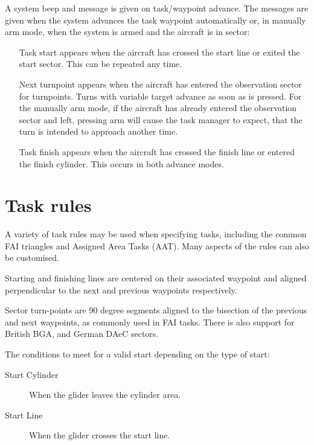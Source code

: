 A system beep and message is given on task/waypoint advance.  The
messages are given when the system advances the task waypoint
automatically or, in manually arm mode, when the system is armed and the
aircraft is in sector:
\begin{itemize}
\item[Task start]  appears when the aircraft has crossed the start line or
 exited the start sector. This can be repeated any time.
\item[Next turnpoint]  appears when the aircraft has entered the observation
 sector for turnpoints. Turns with variable target advance as soon as
  is pressed.  For the manually arm mode, if the
 aircraft has already entered the observation sector and left, pressing arm will
 cause the task manager to expect, that the turn is intended to approach
 another time.
\item[Task finish]  appears when the aircraft has crossed the finish line
 or entered the finish cylinder.  This occurs in both advance modes. 
\end{itemize}

\section{Task rules}\label{sec:task-rules}

A variety of task rules may be used when specifying tasks, including
the common FAI triangles and Assigned Area Tasks (AAT).  Many aspects
of the rules can also be customised.

Starting and finishing lines are centered on their associated waypoint
and aligned perpendicular to the next and previous waypoints
respectively.

Sector turn-points are 90 degree segments aligned to the bisection of
the previous and next waypoints, as commonly used in FAI tasks.
There is also support for British BGA, and German DAeC sectors.

The conditions to meet for a valid start depending on the type of start:
\begin{description}
\item[Start Cylinder] When the glider leaves the cylinder area.
\item[Start Line] When the glider crosses the start line.
\end{description}

